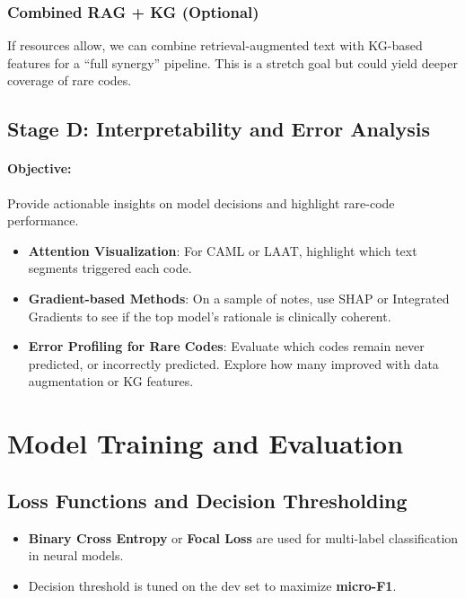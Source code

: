 \subsubsection{Combined RAG + KG (Optional)}
If resources allow, we can combine retrieval-augmented text with KG-based features for a “full synergy” pipeline. This is a stretch goal but could yield deeper coverage of rare codes.

\subsection{Stage D: Interpretability and Error Analysis}
\paragraph{Objective:} Provide actionable insights on model decisions and highlight rare-code performance.

\begin{itemize}
    \item \textbf{Attention Visualization}: For CAML or LAAT, highlight which text segments triggered each code.
    \item \textbf{Gradient-based Methods}: On a sample of notes, use SHAP or Integrated Gradients to see if the top model’s rationale is clinically coherent.
    \item \textbf{Error Profiling for Rare Codes}: Evaluate which codes remain never predicted, or incorrectly predicted. Explore how many improved with data augmentation or KG features.
\end{itemize}


\section{Model Training and Evaluation}

\subsection{Loss Functions and Decision Thresholding}
\begin{itemize}
    \item \textbf{Binary Cross Entropy} or \textbf{Focal Loss} are used for multi-label classification in neural models.
    \item Decision threshold is tuned on the dev set to maximize \textbf{micro-F1}.
\end{itemize}

